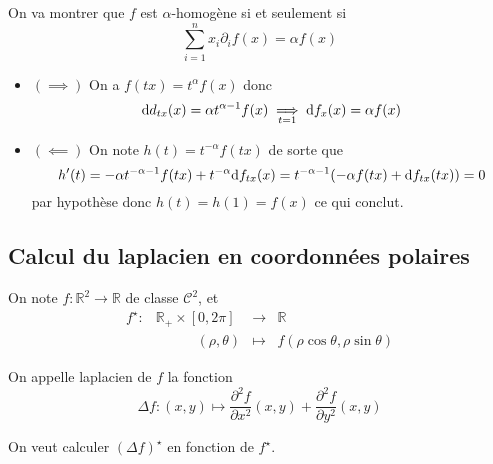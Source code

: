 On va montrer que $f$ est $\alpha$-homogène si et seulement si \[
    \sum_{i=1}^nx_i\partial_if(x)=\alpha f(x)
\]

\begin{itemize}
    \item $(\implies)$ On a $f(tx)=t^\alpha f(x)$ donc \[
            \mathrm{d} d_{tx}(x)=\alpha t^{\alpha-1}f(x)\underset{t=1}\implies \mathrm{d} f_x(x)=\alpha f(x)
        \]
    \item $(\impliedby)$ On note $h(t)=t^{-\alpha}f(tx)$ de sorte que \[
            h'(t)=-\alpha t^{-\alpha-1}f(tx)+t^{-\alpha}\mathrm{d} f_{tx}(x)=t^{-\alpha-1}(-\alpha f(tx)+\mathrm{d} f_{tx}(tx))=0
        \] par hypothèse donc $h(t)=h(1)=f(x)$ ce qui conclut.
\end{itemize}

\subsection{Calcul du laplacien en coordonnées polaires}

On note $f:\mathbb R^2\to \mathbb R $ de classe $\mathcal C^2$, et \[
    \begin{matrix}
        f^\star :&\mathbb R_+\times [0, 2\pi]&\longrightarrow & \mathbb R \\
                 &\phantom{\mathbb R_+\times \;\;}(\rho, \theta) &\longmapsto &f(\rho\cos\theta, \rho\sin\theta)
    \end{matrix}
\]

On appelle laplacien de $f$ la fonction \[
    \Delta f: (x, y)\longmapsto \frac{\partial^2f}{\partial x^2}(x, y)+ \frac{\partial^2 f}{\partial y^2}(x, y)  
\]

On veut calculer $(\Delta f)^\star$ en fonction de $f^\star$.


